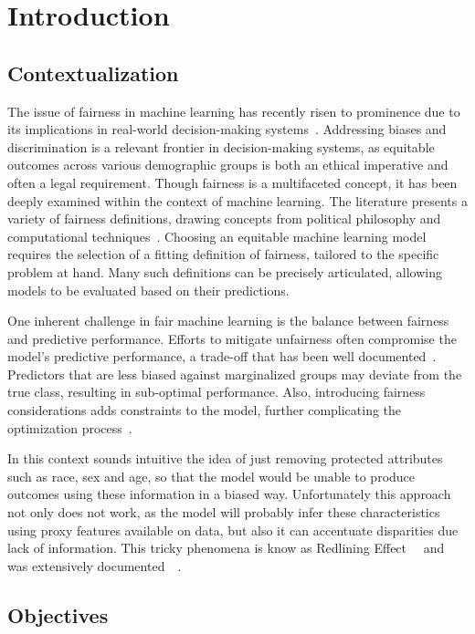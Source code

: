 \chapter{Introduction}

\section{Contextualization}

The issue of fairness in machine learning has recently risen to prominence due to its implications in real-world decision-making systems~\citep{Mehrabi2019,Hutchinson2019}. Addressing biases and discrimination is a relevant frontier in decision-making systems, as equitable outcomes across various demographic groups is both an ethical imperative and often a legal requirement. Though fairness is a multifaceted concept, it has been deeply examined within the context of machine learning. The literature presents a variety of fairness definitions, drawing concepts from political philosophy and computational techniques~\citep{caton2023, Hutchinson2019}. Choosing an equitable machine learning model requires the selection of a fitting definition of fairness, tailored to the specific problem at hand. Many such definitions can be precisely articulated, allowing models to be evaluated based on their predictions.

One inherent challenge in fair machine learning is the balance between fairness and predictive performance. Efforts to mitigate unfairness often compromise the model's predictive performance, a trade-off that has been well documented~\citep{Mehrabi2019, caton2023}. Predictors that are less biased against marginalized groups may deviate from the true class, resulting in sub-optimal performance. Also, introducing fairness considerations adds constraints to the model, further complicating the optimization process~\citep{Zafar2017b}. 

In this context sounds intuitive the idea of just removing protected attributes such as race, sex and age, so that the model would be unable to produce outcomes using these information in a biased way. Unfortunately this approach not only does not work, as the model will probably infer these characteristics using proxy features available on data, but also it can accentuate disparities due lack of information. This tricky phenomena is know as Redlining Effect~~\citep{Pedreschi2008} and was extensively documented~~\citep{Mehrabi2019,caton2023,Hort2023}.

\section{Objectives}

